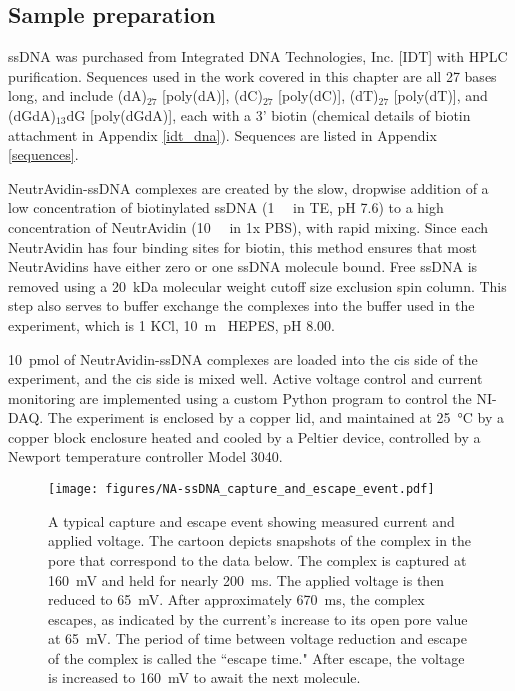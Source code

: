 \subsection{Sample preparation}

ssDNA was purchased from Integrated DNA Technologies, Inc. [IDT] with HPLC purification.  Sequences used in the work covered in this chapter are all 27 bases long, and include (dA)$_{27}$ [poly(dA)], (dC)$_{27}$ [poly(dC)], (dT)$_{27}$ [poly(dT)], and (dGdA)$_{13}$dG [poly(dGdA)], each with a 3' biotin (chemical details of biotin attachment in Appendix \ref{idt_dna}).  Sequences are listed in Appendix \ref{sequences}.

NeutrAvidin-ssDNA complexes are created by the slow, dropwise addition of a low concentration of biotinylated ssDNA (\SI{1}{\micro\Molar} in TE, pH 7.6) to a high concentration of NeutrAvidin (\SI{10}{\micro\Molar} in \num{1}x PBS), with rapid mixing.  Since each NeutrAvidin has four binding sites for biotin, this method ensures that most NeutrAvidins have either zero or one ssDNA molecule bound.  Free ssDNA is removed using a \SI{20}{\kilo\dalton} molecular weight cutoff size exclusion spin column.  This step also serves to buffer exchange the complexes into the buffer used in the experiment, which is \SI{1}{\Molar} KCl, \SI{10}{\m\Molar} HEPES, pH \num{8.00}.

\SI{10}{\pico\mole} of NeutrAvidin-ssDNA complexes are loaded into the cis side of the experiment, and the cis side is mixed well.  Active voltage control and current monitoring are implemented using a custom Python program to control the NI-DAQ.  The experiment is enclosed by a copper lid, and maintained at \SI{25}{\celsius} by a copper block enclosure heated and cooled by a Peltier device, controlled by a Newport temperature controller Model 3040.

\begin{figure}[h]
\begin{centering}
\texttt{[image: figures/NA-ssDNA\_capture\_and\_escape\_event.pdf]}
\caption[Capture and escape experiment schematically]{A typical capture and escape event showing measured current and applied voltage. The cartoon depicts snapshots of the complex in the pore that correspond to the data below.  The complex is captured at \SI{160}{\mV} and held for nearly \SI{200}{\ms}.  The applied voltage is then reduced to \SI{65}{\mV}.  After approximately \SI{670}{\ms}, the complex escapes, as indicated by the current's increase to its open pore value at \SI{65}{\mV}.  The period of time between voltage reduction and escape of the complex is called the ``escape time."  After escape, the voltage is increased to \SI{160}{\mV} to await the next molecule.}
\label{fig:capture_escape_event}
\end{centering}
\end{figure}

